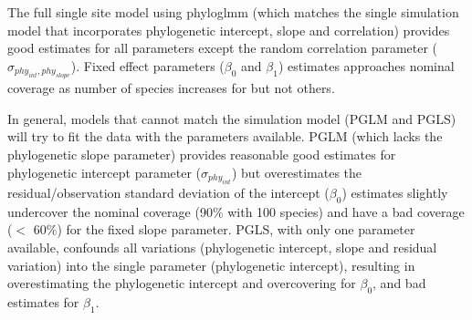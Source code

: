 \documentclass[12pt]{article}
\begin{document}



The full single site model using phyloglmm (which matches the single simulation model that incorporates phylogenetic intercept, slope and correlation) provides good estimates for all parameters except the random correlation parameter ($\sigma_{phy_{int},phy_{slope}}$). 
Fixed effect parameters ($\beta_0$ and $\beta_1$) estimates approaches nominal coverage as number of species increases for  but not others.

In general, models that cannot match the simulation model (PGLM and PGLS) will try to fit the data with the parameters available. 
PGLM (which lacks the phylogenetic slope parameter) provides reasonable good estimates for phylogenetic intercept parameter ($\sigma_{phy_{int}}$) but overestimates the residual/observation standard deviation of the intercept ($\beta_0$) estimates slightly undercover the nominal coverage (90\% with 100 species) and have a bad coverage ($<$ 60\%) for the fixed slope parameter.
PGLS, with only one parameter available, confounds all variations (phylogenetic intercept, slope and residual variation) into the single parameter (phylogenetic intercept), resulting in overestimating the phylogenetic intercept and overcovering for $\beta_0$, and bad estimates for $\beta_1$.
\end{document}
